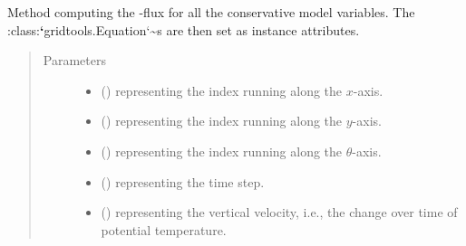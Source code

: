 \documentclass[letterpaper,10pt,english]{sphinxmanual}
\begin{document}
\begin{fulllineitems}
\begin{fulllineitems}
\begin{quote}
\begin{description}
\begin{itemize}
\end{itemize}

\end{description}\end{quote}

\end{fulllineitems}


\begin{fulllineitems}
\label{\detokenize{api:dycore.flux_isentropic_maccormack.FluxIsentropicMacCormack._compute_vertical_fluxes}}
Method computing the -flux
for all the conservative model variables.
The :class:{\color{red}\bfseries{}{}`}gridtools.Equation{}`\textasciitilde{}s are then set as instance attributes.
\begin{quote}\begin{description}
\item[{Parameters}] \leavevmode\begin{itemize}
\item {} 
 () \textendash{}  representing the index running along the \(x\)-axis.

\item {} 
 () \textendash{}  representing the index running along the \(y\)-axis.

\item {} 
 () \textendash{}  representing the index running along the \(\theta\)-axis.

\item {} 
 () \textendash{}  representing the time step.

\item {} 
 () \textendash{}  representing the vertical velocity,
i.e., the change over time of potential temperature.


\end{itemize}
\end{description}
\end{quote}
\end{fulllineitems}
\end{fulllineitems}
\end{document}
